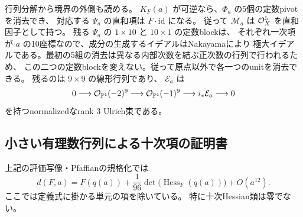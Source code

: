 行列分解から境界の外側も読める。
$K_F(a)$ が可逆なら、$\Phi_a$ の5個の定数pivotを消去でき、
対応する $\Psi_a$ の直和項は $F\cdot\mathrm{id}$ になる。
従って $\mathcal M_a$ は $\mathcal O_X^5$ を直和因子として持つ。
残る $\Psi_a$ の $1\times10$ と $10\times1$ の定数blockは、
それぞれ一次項が $a$ の10座標なので、成分の生成するイデアルはNakayamaにより
極大イデアルである。最初の5組の消去は異なる内部次数を結ぶ正次数の行列で行われるため、
この二つの定数blockを変えない。従って原点以外で各一つのunitを消去できる。
残るのは $9\times9$ の線形行列であり、
$\mathcal E_a$ は
\[
 0\longrightarrow\mathcal O_{\mathbb P^4}(-2)^9
 \longrightarrow\mathcal O_{\mathbb P^4}(-1)^9
 \longrightarrow i_*\mathcal E_a\longrightarrow0
\]
を持つnormalizedなrank 3 Ulrich束である。

\subsection{小さい有理数行列による十次項の証明書}

\begin{theorem}[普遍十次係数]\label{thm:tate-tenth-coefficient}
上記の評価写像・Pfaffianの規格化では
\[
 \boxed{\displaystyle
 d(F,a)=F(q(a))+\frac1{96}\det\bigl(\operatorname{Hess}_F(q(a))\bigr)
       +O(a^{12}).}
 \tag{T9}\label{eq:tate-tenth-coefficient}
\]
ここでは定義式に掛かる単元の項を除いている。
特に十次Hessian類は零でない。
\end{theorem}


